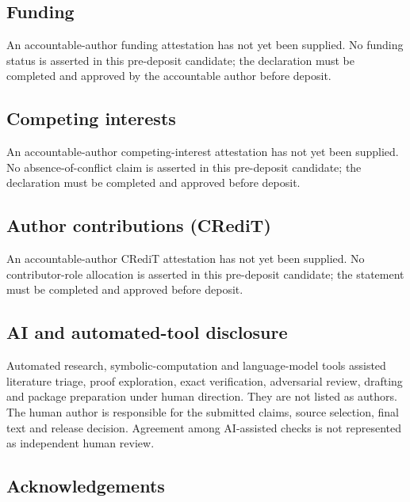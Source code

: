 \documentclass[
]{article}
\begin{document}
\subsection*{Funding}\label{funding}

An accountable-author funding attestation has not yet been supplied. No
funding status is asserted in this pre-deposit candidate; the
declaration must be completed and approved by the accountable author
before deposit.

\subsection*{Competing interests}\label{competing-interests}

An accountable-author competing-interest attestation has not yet been
supplied. No absence-of-conflict claim is asserted in this pre-deposit
candidate; the declaration must be completed and approved before
deposit.

\subsection*{Author contributions
(CRediT)}\label{author-contributions-credit}

An accountable-author CRediT attestation has not yet been supplied. No
contributor-role allocation is asserted in this pre-deposit candidate;
the statement must be completed and approved before deposit.

\subsection*{AI and automated-tool
disclosure}\label{ai-and-automated-tool-disclosure}

Automated research, symbolic-computation and language-model tools
assisted literature triage, proof exploration, exact verification,
adversarial review, drafting and package preparation under human
direction. They are not listed as authors. The human author is
responsible for the submitted claims, source selection, final text and
release decision. Agreement among AI-assisted checks is not represented
as independent human review.

\subsection*{Acknowledgements}\label{acknowledgements}
\end{document}
